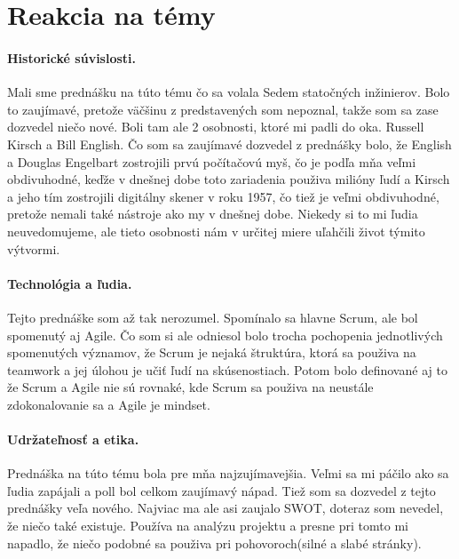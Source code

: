 \documentclass[10pt,oneside,slovak,a4paper]{article}
\begin{document}
\section{Reakcia na témy} \label{reakcia}


\paragraph{Historické súvislosti.}
Mali sme prednášku na túto tému čo sa volala Sedem statočných inžinierov. Bolo to zaujímavé, pretože väčšinu z predstavených som nepoznal, takže som sa zase dozvedel niečo nové. Boli tam ale 2 osobnosti, ktoré mi padli do oka. Russell Kirsch a Bill English. Čo som sa zaujímavé dozvedel z prednášky bolo, že English a Douglas Engelbart zostrojili prvú počítačovú myš, čo je podľa mňa veľmi obdivuhodné, keďže v dnešnej dobe toto zariadenia použiva milióny ľudí a Kirsch a jeho tím zostrojili digitálny skener v roku 1957, čo tiež je veľmi obdivuhodné, pretože nemali také nástroje ako my v dnešnej dobe. Niekedy si to mi ľudia neuvedomujeme, ale tieto osobnosti nám v určitej miere uľahčili život týmito výtvormi.

\paragraph{Technológia a ľudia.}
Tejto prednáške som až tak nerozumel. Spomínalo sa hlavne Scrum, ale bol spomenutý aj Agile. Čo som si ale odniesol bolo trocha pochopenia jednotlivých spomenutých významov, že Scrum je nejaká štruktúra, ktorá sa použiva na teamwork a jej úlohou je učiť ľudí na skúsenostiach. Potom bolo definované aj to že Scrum a Agile nie sú rovnaké, kde Scrum sa použiva na neustále zdokonalovanie sa a Agile je mindset. 

\paragraph{Udržateľnosť a etika.}
Prednáška na túto tému bola pre mňa najzujímavejšia. Veľmi sa mi páčilo ako sa ľudia zapájali a poll bol celkom zaujímavý nápad. Tiež som sa dozvedel z tejto prednášky veľa nového. Najviac ma ale asi zaujalo SWOT, doteraz som nevedel, že niečo také existuje. Používa na analýzu projektu a presne pri tomto mi napadlo, že niečo podobné sa použiva pri pohovoroch(silné a slabé stránky).



 
\end{document}
